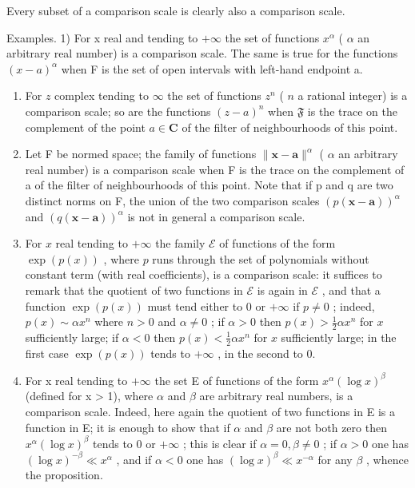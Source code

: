 Every subset of a comparison scale is clearly also a comparison scale.

Examples. 1) For x real and tending to \(+\infty\) the set of functions \(x^{\alpha}\) ( \(\alpha\) an arbitrary real number) is a comparison scale. The same is true for the functions \((x - a)^{\alpha}\) when F is the set of open intervals with left-hand endpoint a.

\begin{enumerate}
\def\labelenumi{\arabic{enumi})}
\setcounter{enumi}{1}
\item
  For \(z\) complex tending to \(\infty\) the set of functions \(z^n\) ( \(n\) a rational integer) is a comparison scale; so are the functions \((z - a)^n\) when \(\mathfrak{F}\) is the trace on the complement of the point \(a \in \mathbf{C}\) of the filter of neighbourhoods of this point.
\item
  Let F be normed space; the family of functions \(\|\mathbf{x}-\mathbf{a}\|^{\alpha}\) ( \(\alpha\) an arbitrary real number) is a comparison scale when F is the trace on the complement of a of the filter of neighbourhoods of this point. Note that if p and q are two distinct norms on F, the union of the two comparison scales \(\left(p(\mathbf{x}-\mathbf{a})\right)^{\alpha}\) and \(\left(q(\mathbf{x}-\mathbf{a})\right)^{\alpha}\) is not in general a comparison scale.
\item
  For \(x\) real tending to \(+\infty\) the family \(\mathcal{E}\) of functions of the form \(\exp(p(x))\) , where \(p\) runs through the set of polynomials without constant term (with real coefficients), is a comparison scale: it suffices to remark that the quotient of two functions in \(\mathcal{E}\) is again in \(\mathcal{E}\) , and that a function \(\exp(p(x))\) must tend either to 0 or \(+\infty\) if \(p \neq 0\) ; indeed, \(p(x) \sim \alpha x^n\) where \(n > 0\) and \(\alpha \neq 0\) ; if \(\alpha > 0\) then \(p(x) > \frac{1}{2}\alpha x^n\) for \(x\) sufficiently large; if \(\alpha < 0\) then \(p(x) < \frac{1}{2}\alpha x^n\) for \(x\) sufficiently large; in the first case \(\exp(p(x))\) tends to \(+\infty\) , in the second to 0.
\item
  For x real tending to \(+\infty\) the set E of functions of the form \(x^{\alpha}(\log x)^{\beta}\) (defined for x \textgreater{} 1), where \(\alpha\) and \(\beta\) are arbitrary real numbers, is a comparison scale. Indeed, here again the quotient of two functions in E is a function in E; it is enough to show that if \(\alpha\) and \(\beta\) are not both zero then \(x^{\alpha}(\log x)^{\beta}\) tends to 0 or \(+\infty\) ; this is clear if \(\alpha = 0, \beta \neq 0\) ; if \(\alpha > 0\) one has \((\log x)^{-\beta} \ll x^{\alpha}\) , and if \(\alpha < 0\) one has \((\log x)^{\beta} \ll x^{-\alpha}\) for any \(\beta\) , whence the proposition.
\end{enumerate}

